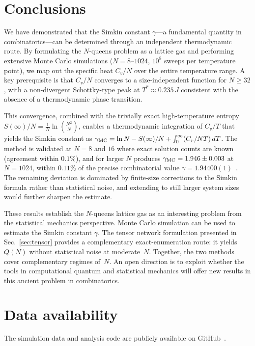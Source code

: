 \documentclass[aps, pre, reprint, amsmath, amssymb, superscriptaddress, floatfix]{revtex4-2}
\begin{document}
\FloatBarrier
\section{Conclusions}
\label{sec:conclusions}

We have demonstrated that the Simkin constant $\gamma$---a
fundamental quantity in combinatorics---can be determined through
an independent thermodynamic route.  By formulating the $N$-queens
problem as a lattice gas and performing extensive Monte Carlo
simulations ($N = 8$--$1024$, $10^8$ sweeps per temperature point),
we map out the specific heat $C_v/N$ over the entire temperature
range.  A key prerequisite is that $C_v/N$ converges to a
size-independent function for $N \ge 32$, with a non-divergent
Schottky-type peak at $T^* \approx 0.235\,J$ consistent with the
absence of a thermodynamic phase transition.

This convergence, combined with the trivially exact high-temperature
entropy $S(\infty)/N = \frac{1}{N}\ln\binom{N^2}{N}$, enables a
thermodynamic integration of $C_v/T$ that yields the Simkin constant
as $\gamma_{\rm MC} = \ln N - S(\infty)/N + \int_0^\infty
(C_v/NT)\,dT$.  The method is validated at $N = 8$ and $16$ where
exact solution counts are known (agreement within $0.1\%$), and for
larger $N$ produces $\gamma_{\rm MC} = 1.946 \pm 0.003$ at
$N = 1024$, within $0.11\%$ of the precise combinatorial
value $\gamma = 1.94400(1)$~\cite{Nobel2023}.  The remaining deviation
is dominated by finite-size corrections to the Simkin formula rather
than statistical noise, and extending to still larger system sizes
would further sharpen the estimate.

These results establish the $N$-queens lattice gas as an interesting 
problem from the statistical mechanics perspective. Monte Carlo
simulation can be used to estimate the
Simkin constant $\gamma$.
The tensor network formulation presented in Sec.~\ref{sec:tensor}
provides a complementary exact-enumeration route: it yields $Q(N)$
without statistical noise at moderate~$N$.  Together, the two methods
cover complementary regimes of~$N$. An open direction is to
exploit whether the tools in computational quantum and statistical mechanics will 
offer new results in this ancient problem in combinatorics. 


\section{Data availability}
The simulation data and analysis code are publicly available on
GitHub~\cite{github_repo}.
\end{document}
